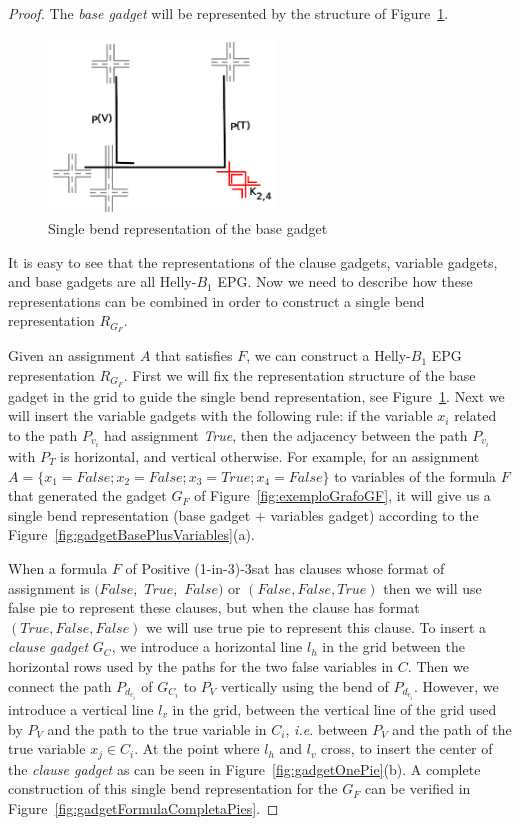 \documentclass[
submission
]{dmtcs-episciences}
\begin{document}
\begin{proof}
The \textit{base gadget} will be represented by the structure of Figure~\ref{fig:gadgetBaseSingleBend}.

%
\begin{figure}[htb]	
\center%
\includegraphics[width=6cm]{gadgetBaseB1Epg}%
\caption{Single bend representation of the base gadget}
\label{fig:gadgetBaseSingleBend}
\end{figure}


It is easy to see that the representations of the clause gadgets, variable gadgets, and base gadgets are all Helly-$B_1$ EPG. Now we need to describe how these representations can be combined in order to construct a single bend representation $R_{G_F}$.

Given an assignment $A$ that satisfies $F$, we can construct a  Helly-$B_1$ EPG representation $R_{G_F}$. First we will fix the representation structure of the base gadget in the grid to guide the single bend representation, see Figure~\ref{fig:gadgetBaseSingleBend}. Next we will insert the variable gadgets with the following rule: if the  variable $x_i$ related to the path $P_{v_i}$ had assignment \textit{True}, then the adjacency between the path $P_{v_i}$ with $P_T$ is horizontal, and vertical otherwise. For example, for an assignment $A=\{x_1=False; x_2=False;x_3=True; x_4=False\}$  to variables of the formula $F$ that generated the gadget $G_F$ of Figure~\ref{fig:exemploGrafoGF}, it will give us a single bend representation (base gadget + variables gadget) according to the Figure~\ref{fig:gadgetBasePlusVariables}(a). 

 When a formula $F$ of {\sc Positive (1-in-3)-3sat} has clauses whose format of assignment is $(False,$ $True,$ $False)$ or $(False, False, True)$ then we will use false pie to represent these clauses, but when the clause has format $(True, False, False)$ we will use true pie to represent this clause. To insert a \textit{ clause gadget} $G_{C}$, we introduce a horizontal line $l_{h}$ in the grid between the horizontal rows used by the paths for the two false variables in $ C $. Then we connect the path $P_{d_{c_i}}$ of $G_{C_i}$ to $P_V$ vertically using the bend of $P_{d_{c_i}}$. However, we introduce a vertical line $ l_{v}$ in the grid, between the vertical line of the grid used by $P_V$ and the path to the true variable in $C_i$, \textit{i.e.} between $P_V$ and the path of the true variable $x_j \in C_i$. At the point where $l_{h}$ and $l_{v}$ cross, to insert the center of the  \textit{clause gadget} as can be seen in Figure~\ref{fig:gadgetOnePie}(b). A complete construction of this single bend representation for the $G_F$ can be verified in 
Figure~\ref{fig:gadgetFormulaCompletaPies}.%


\end{proof}
\end{document}
